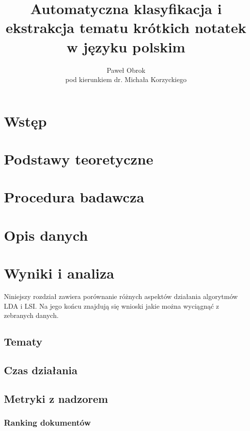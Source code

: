 \documentclass[11pt,a4paper]{article}
\begin{document}
\title{Automatyczna klasyfikacja i ekstrakcja tematu krótkich notatek w języku polskim}
\author{Paweł Obrok\\pod kierunkiem dr. Michała Korzyckiego}

\maketitle
\pagebreak

\tableofcontents
\pagebreak

\section{Wstęp}
\section{Podstawy teoretyczne}
\section{Procedura badawcza}
\section{Opis danych}
\section{Wyniki i analiza}

Niniejszy rozdział zawiera porównanie różnych aspektów działania algorytmów LDA
i LSI. Na jego końcu znajdują się wnioski jakie można wyciągnąć z zebranych
danych.

\subsection{Tematy}

\subsection{Czas działania}

\subsection{Metryki z nadzorem}

\subsubsection{Ranking dokumentów}
\end{document}
